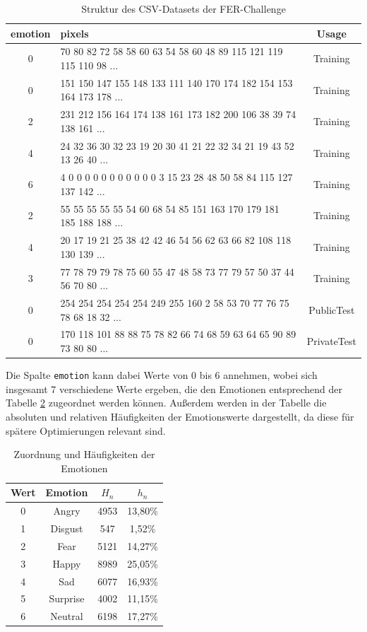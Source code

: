 \documentclass[12pt, a4paper]{report}
\begin{document}
\begin{table}[h]
\centering
\begin{tabular}[t]{c|l|c}
emotion & pixels & Usage \\
\hline
0 & 70 80 82 72 58 58 60 63 54 58 60 48 89 115 121 119 115 110 98 ... & Training \\
0 & 151 150 147 155 148 133 111 140 170 174 182 154 153 164 173 178 ... & Training \\
2 & 231 212 156 164 174 138 161 173 182 200 106 38 39 74 138 161 ... & Training \\
4 & 24 32 36 30 32 23 19 20 30 41 21 22 32 34 21 19 43 52 13 26 40 ... & Training \\
6 & 4 0 0 0 0 0 0 0 0 0 0 0 3 15 23 28 48 50 58 84 115 127 137 142 ... & Training \\
2 & 55 55 55 55 55 54 60 68 54 85 151 163 170 179 181 185 188 188 ... & Training \\
4 & 20 17 19 21 25 38 42 42 46 54 56 62 63 66 82 108 118 130 139 ... & Training \\
3 & 77 78 79 79 78 75 60 55 47 48 58 73 77 79 57 50 37 44 56 70 80 ... & Training \\
0 & 254 254 254 254 254 249 255 160 2 58 53 70 77 76 75 78 68 18 32 ... & PublicTest \\
0 & 170 118 101 88 88 75 78 82 66 74 68 59 63 64 65 90 89 73 80 80 ... & PrivateTest \\
\hline
\end{tabular}
\caption{Struktur des CSV-Datasets der FER-Challenge}
\label{tab:FER2013}
\end{table}
Die Spalte \texttt{emotion} kann dabei Werte von 0 bis 6 annehmen, wobei sich insgesamt 7 verschiedene Werte ergeben, die den Emotionen entsprechend der Tabelle \ref{tab:feremotions} zugeordnet werden können. Außerdem werden in der Tabelle die absoluten und relativen Häufigkeiten der Emotionswerte dargestellt, da diese für spätere Optimierungen relevant sind.
\begin{table}[h]
\centering
\begin{tabular}[t]{c|c|c|c}
Wert & Emotion & $H_n$ & $h_n$ \\
\hline
0 & Angry & 4953 & 13,80\% \\
1 & Disgust & 547 & 1,52\% \\
2 & Fear & 5121 & 14,27\% \\
3 & Happy & 8989 & 25,05\% \\
4 & Sad & 6077 & 16,93\% \\
5 & Surprise & 4002 & 11,15\% \\
6 & Neutral & 6198 & 17,27\% \\
\hline
\end{tabular}
\caption{Zuordnung und Häufigkeiten der Emotionen}
\label{tab:feremotions}
\end{table}
\end{document}
